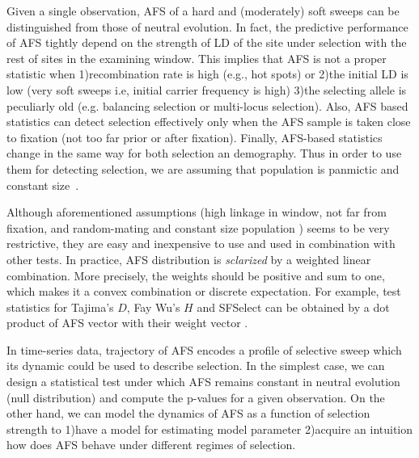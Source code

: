 \documentclass[11pt]{article}
\begin{document}
Given a single observation, AFS of a hard and (moderately) soft sweeps can be 
distinguished from those of neutral evolution. In fact, the predictive 
performance of AFS tightly depend on the strength of LD of the site under 
selection with the rest of sites in the examining window. This implies that AFS 
is not a proper statistic when 1)recombination rate is high (e.g., hot spots) 
or 2)the initial LD is low\cite{} (very soft sweeps i.e, initial carrier 
frequency is 
high) 3)the 
selecting allele is peculiarly old (e.g. balancing selection\cite{} or 
multi-locus 
selection\cite{}). Also, AFS based statistics can detect selection  effectively 
only when the AFS sample is taken close to fixation (not too far prior or after 
fixation)\cite{}. 
Finally, AFS-based statistics change in the same way for both selection  an 
demography. Thus in order to use them for detecting selection, we are assuming 
that population is panmictic and constant size~\cite{}.

Although aforementioned assumptions (high linkage in window, not far from 
fixation, and random-mating and constant size population ) seems to be very 
restrictive, they are easy and inexpensive to use and used in combination with 
other tests. In practice, AFS distribution is \emph{sclarized} by a weighted 
linear combination. More precisely,  the weights should be positive and sum to 
one, which makes it a convex combination or discrete expectation. For example, 
test statistics for Tajima's $D$\cite{}, Fay Wu's $H$\cite{} and 
SFSelect\cite{} can be obtained by a dot product of AFS vector with their 
weight vector \cite{achaz2009frequency}.

In time-series data, trajectory of AFS encodes a profile of selective sweep 
which its dynamic could be used to describe selection. In the simplest case, we 
can design a statistical test under which AFS remains constant in neutral 
evolution (null distribution) and compute the p-values for a given observation. 
On the other hand, we can model the dynamics of AFS as a function of selection 
strength to 1)have a model for estimating model parameter 2)acquire an 
intuition how does AFS behave under different regimes of selection.
\end{document}
